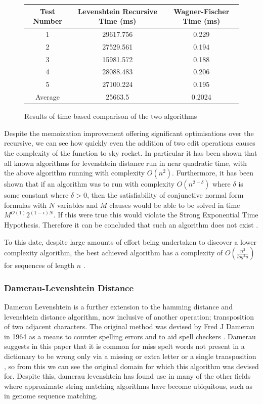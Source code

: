 \documentclass[a4paper,11pt]{article}
\begin{document}
\begin{figure}[H]
\begin{center}
    \begin{tabular}{|c|c|c|}
    \hline
         Test Number & Levenshtein Recursive Time (ms) & Wagner-Fischer Time (ms) \\
         \hline \hline
         1 & 29617.756 &  0.229 \\ \hline
         2 & 27529.561 &  0.194 \\ \hline
         3 & 15981.572 &  0.188 \\ \hline
         4 & 28088.483 &  0.206 \\ \hline
         5 & 27100.224 &  0.195 \\ 
        \hline \hline
        Average & 25663.5 & 0.2024 \\
        \hline
    \end{tabular}
\end{center}
    \caption{Results of time based comparison of the two algorithms}
    \label{fig:levenshteinResults}
\end{figure}

Despite the memoization improvement offering significant optimisations over the recursive, we can see how quickly even the addition of two edit operations causes the complexity of the function to sky rocket. In particular it has been shown that all known algorithms for levenshtein distance run in near quadratic time, with the above algorithm running with complexity $O(n^2)$. Furthermore, it has been shown that if an algorithm was to run with complexity $O(n^{2-\delta})$ where $\delta$ is some constant where $\delta > 0$, then the satisfiability of conjunctive normal form formulas with $N$ variables and $M$ clauses would be able to be solved in time $M^{O(1)}2^{(1-\epsilon)N}$. If this were true this would violate the Strong Exponential Time Hypothesis. Therefore it can be concluded that such an algorithm does not exist \citep{levenshteinComplexityProof}.


To this date, despite large amounts of effort being undertaken to discover a lower complexity algorithm, the best achieved algorithm has a complexity of $O(\frac{n^2}{log^2n})$ for sequences of length $n$ \citep{fastestLevenshteinAlg}.

\subsubsection{Damerau-Levenshtein Distance}
Damerau Levenshtein is a further extension to the hamming distance and levenshtein distance algorithm, now inclusive of another operation; transposition of two adjacent characters. The original method was devised by Fred J Damerau in 1964 as a means to counter spelling errors and to aid spell checkers \citep{damerauLevenshtein}. Damerau suggests in this paper that it is common for miss spelt words not present in a dictionary to be wrong only via a missing or extra letter or a single transposition \citep{damerauLevenshtein}, so from this we can see the original domain for which this algorithm was devised for. Despite this, damerau levenshtein has found use in many of the other fields where approximate string matching algorithms have become ubiquitous, such as in genome sequence matching.
\end{document}
